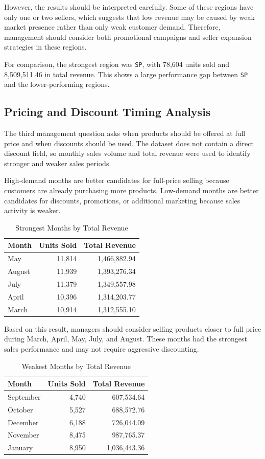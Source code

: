 \documentclass[12pt]{article}
\begin{document}
However, the results should be interpreted carefully. Some of these regions have
only one or two sellers, which suggests that low revenue may be caused by weak
market presence rather than only weak customer demand. Therefore, management
should consider both promotional campaigns and seller expansion strategies in
these regions.

For comparison, the strongest region was \texttt{SP}, with 78,604 units sold and
8,509,511.46 in total revenue. This shows a large performance gap between
\texttt{SP} and the lower-performing regions.


\subsection{Pricing and Discount Timing Analysis}

The third management question asks when products should be offered at full price
and when discounts should be used. The dataset does not contain a direct discount
field, so monthly sales volume and total revenue were used to identify stronger
and weaker sales periods.

High-demand months are better candidates for full-price selling because customers
are already purchasing more products. Low-demand months are better candidates for
discounts, promotions, or additional marketing because sales activity is weaker.

\begin{table}[H]
\centering
\begin{tabular}{lrr}
\toprule
Month & Units Sold & Total Revenue \\
\midrule
May & 11,814 & 1,466,882.94 \\
August & 11,939 & 1,393,276.34 \\
July & 11,379 & 1,349,557.98 \\
April & 10,396 & 1,314,203.77 \\
March & 10,914 & 1,312,555.10 \\
\bottomrule
\end{tabular}
\caption{Strongest Months by Total Revenue}
\end{table}

Based on this result, managers should consider selling products closer to full
price during March, April, May, July, and August. These months had the strongest
sales performance and may not require aggressive discounting.

\begin{table}[H]
\centering
\begin{tabular}{lrr}
\toprule
Month & Units Sold & Total Revenue \\
\midrule
September & 4,740 & 607,534.64 \\
October & 5,527 & 688,572.76 \\
December & 6,188 & 726,044.09 \\
November & 8,475 & 987,765.37 \\
January & 8,950 & 1,036,443.36 \\
\bottomrule
\end{tabular}
\caption{Weakest Months by Total Revenue}
\end{table}
\end{document}
